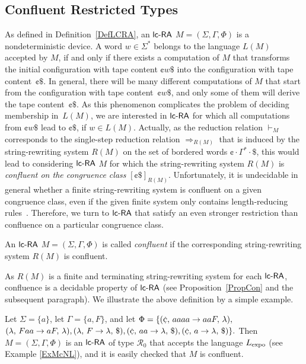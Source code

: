 \subsection{Confluent Restricted Types}\label{section:confluent_lcra}

As defined in Definition~\ref{DefLCRA}, an $\lcRA$ $M=(\Sigma,\Gamma,\Phi)$ is a nondeterministic device. A word $w\in\Sigma^*$ belongs to the language $L(M)$ accepted by $M$, if and only if there exists a computation of $M$ that transforms the initial configuration with tape content $\cent w\$$ into the configuration with tape content~$\cent\$$. In general, there will be many different computations of $M$ that start from the configuration with tape content~$\cent w\$$, and only some of them will derive the tape content~$\cent \$$. As this phenomenon complicates the problem of deciding membership in~$L(M)$, we are interested in $\lcRA$ for which all computations from $\cent w\$$ lead to $\cent\$$, if $w\in L(M)$. Actually, as the reduction relation $\vdash_M$ corresponds to the single-step reduction relation $\Rightarrow_{R(M)}$ that is induced by the string-rewriting system $R(M)$ on the set of bordered words $\cent\cdot\Gamma^*\cdot \$$, this would lead to considering $\lcRA$ $M$ for which the string-rewriting system $R(M)$ is \emph{confluent on the congruence class} $[\cent\$]_{R(M)}$. Unfortunately, it is undecidable in general whether a finite string-rewriting system is confluent on a given congruence class, even if the given finite system only contains length-reducing rules~\cite{otto27}. Therefore, we turn to $\lcRA$ that satisfy an even stronger restriction than confluence on a particular congruence class.
%
\begin{definition}\label{DefConf}
An $\lcRA$ $M=(\Sigma,\Gamma,\Phi)$ is called \emph{confluent} if the corresponding string-rewriting system $R(M)$ is confluent.
\end{definition}

As $R(M)$ is a finite and terminating string-rewriting system for each $\lcRA$, confluence is a decidable property of $\lcRA$ (see Proposition~\ref{PropCon} and the subsequent paragraph). We illustrate the above definition by a simple example.

\begin{example}\label{ExConLcR}
 Let $\Sigma=\{a\}$, let $\Gamma = \{a,F\}$, and let 
$\Phi=\{\rarule{\cent}{aaaa}{aaF}{\lambda},$ $\rarule{\lambda}{Faa}{aF}{\lambda},
        \rarule{\lambda}{F}{\lambda}{\$},\rarule{\cent}{aa}{\lambda}{\$},\rarule{\cent}{a}{\lambda}{\$}\}.$ Then $M=(\Sigma,\Gamma,\Phi)$ is an $\lcRA$ of type $\mathcal{R}_0$ that accepts the language $L_{\rm expo}$ (see Example \ref{ExMcNL}), and it is easily checked that $M$ is confluent.
\end{example}

